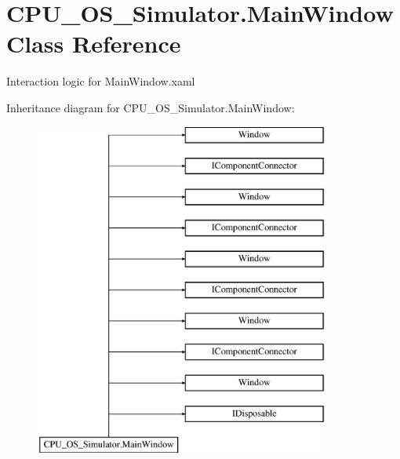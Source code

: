 \hypertarget{class_c_p_u___o_s___simulator_1_1_main_window}{}\section{C\+P\+U\+\_\+\+O\+S\+\_\+\+Simulator.\+Main\+Window Class Reference}
\label{class_c_p_u___o_s___simulator_1_1_main_window}


Interaction logic for Main\+Window.\+xaml  


Inheritance diagram for C\+P\+U\+\_\+\+O\+S\+\_\+\+Simulator.\+Main\+Window\+:\begin{figure}[H]
\begin{center}
\leavevmode
\includegraphics[height=11.000000cm]{class_c_p_u___o_s___simulator_1_1_main_window}
\end{center}
\end{figure}
